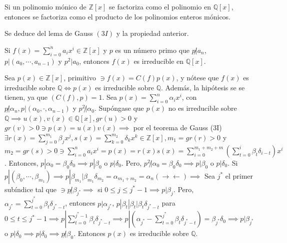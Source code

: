 \begin{corolario}
    Si un polinomio mónico de $\mathbb{Z}[x]$ se factoriza como el polinomio en $\mathbb{Q}[x]$, entonces se factoriza como el producto de los polinomios enteros mónicos. 
    \begin{dem}
        Se deduce del lema de Gauss $(3I)$ y la propiedad anterior. 
    \end{dem}
\end{corolario}

\begin{teorema}
    Si $f(x)=\sum_{i=0}^{n}a_ix^{i}\in \mathbb{Z}[x]$ y $p$ es un número primo que $p\not|a_n$, $p|(a_0,\cdots, a_{n-1})$ y $p^2|a_0$, entonces $f(x)$ es irreducible en $\mathbb{Q}[x]$.
    \begin{dem}
        Sea $p(x)\in \mathbb{Z}[x]$, primitivo $\ni f(x)=C(f)p(x)$, y nótese que $f(x)$ es irreducible sobre $\mathbb{Q}\iff p(x)$ es irreducible sobre $\mathbb{Q}$. Además, la hipótesis se se tienen, ya que $(C(f),p)=1$. Sea $p(x)=\sum_{i=0}^n \alpha_i x^i$, con $p\not| \alpha_n,p|(\alpha_0,\cdot,\alpha_{n-1})$ y $p^2\not | \alpha_0$. Supóngase que $p(x)$ no es irreducible sobre $\mathbb{Q}\implies u(x),v(x)\in \mathbb{Q}[x], gr(u)>0$ y $gr(v)>0\ni p(x)=u(x)v(x)\implies$ por el teorema de Gauss (3I) $\exists r(x)=\sum_{j=0}^{m_1} \beta_jx^j, s(x)=\sum_{k=0}^{m_2}\delta_kx^k\in\mathbb{Z}[x], m_1=gr(r)>0$ y $m_2=gr(s)>0\ni \sum_{i=0}^n a_i x^i = p(x)=r(x)s(x)=\sum_{i=0}^{m_1+m_2+m}\left(\sum_{t=0}^i \beta_t\delta_{i-t}\right)x^i$. Entonces, $p|\alpha_0=\beta_0\delta_0\implies p|\beta_0$ o $p|\delta_0$. Pero, $p^2\not|\alpha_0=\beta_0\delta_0\implies p|\beta_0$ o $p|\delta_0$. Si $p|(\beta_0,\cdots,\beta_{m_1})\implies p|\beta_{m_1}|\beta_{m_1}\delta_{m_2}=\alpha_{m_1+m_2}=\alpha_n(\to\gets)\implies$ Sea $j^*$ el primer subíndice tal que $\ni p\not|\beta_{j^*}\implies$ si $0\leq j\leq j^*-1\implies p|\beta_j$. Pero, $\alpha_{j^*}=\sum_{t=0}^{j^*}\beta_t\delta_{j^*-t}$, entonces $p|\alpha_{j^*}$, $p|\beta_t|\beta_t|\beta_t\delta_{j^*-t}$ para $0\leq t\leq j^*-1\implies p|\sum_{t=0}^{j^*-1}\beta_t\delta_{j^*-t}\implies p|(\alpha_{j^*}-\sum_{t=0}^{j^*}\beta_t\delta_{j^*-t})=\beta_{j^*}\delta_0\implies p|\beta_{j^*}$ o $p|\delta_0\implies p|\delta_0\implies p\not|\beta_0$. Entonces $p(x)$ es irreducible sobre $\mathbb{Q}$. 
    \end{dem}
\end{teorema}